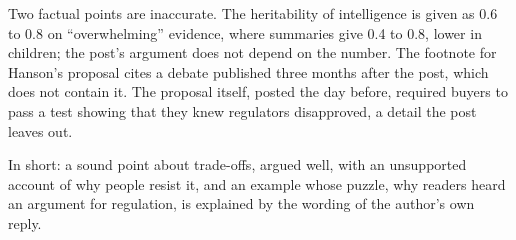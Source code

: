 \begin{afterword}
Two factual points are inaccurate. The heritability of intelligence is given as 0.6 to 0.8 on ``overwhelming'' evidence, where summaries give 0.4 to 0.8, lower in children; the post's argument does not depend on the number. The footnote for Hanson's proposal cites a debate published three months after the post, which does not contain it. The proposal itself, posted the day before, required buyers to pass a test showing that they knew regulators disapproved, a detail the post leaves out.

In short: a sound point about trade-offs, argued well, with an unsupported account of why people resist it, and an example whose puzzle, why readers heard an argument for regulation, is explained by the wording of the author's own reply.
\end{afterword}

